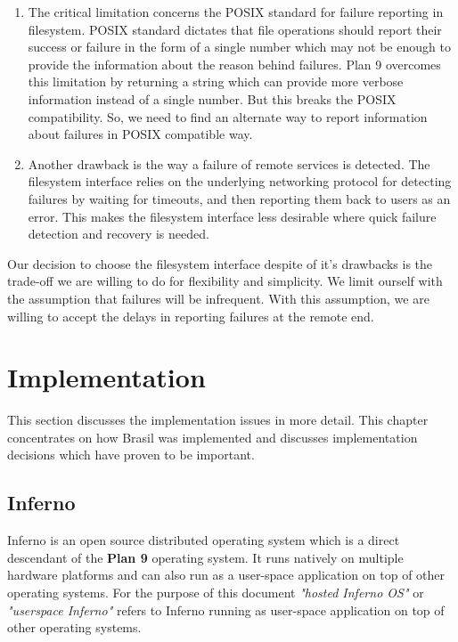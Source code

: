 \documentclass[conference]{sig-alternate}
\begin{document}
\begin{enumerate}

\item The critical limitation concerns the POSIX standard for failure
reporting in filesystem.  POSIX standard dictates that file operations should
report their success or failure in the form of a single number which may not be
enough to provide the information about the reason behind failures.  Plan 9
overcomes this limitation by returning a string which can provide more
verbose information instead of a single number.  But this breaks the POSIX
compatibility.  So, we need to find an alternate way to report information
about failures in POSIX compatible way.

\item Another drawback is the way a failure of remote services is detected.
The filesystem interface relies on the underlying networking protocol for
detecting failures by waiting for timeouts, and then reporting them back to
users as an error.  This makes the filesystem interface less desirable where
quick failure detection and recovery is needed.


\end{enumerate}

Our decision to choose the filesystem interface despite of it's drawbacks is the
trade-off we are willing to do for flexibility and simplicity.  We limit
ourself with the assumption that failures will be infrequent.  With this
assumption, we are willing to accept the delays in reporting failures at the
remote end.


\section{Implementation}

This section discusses the implementation issues in more detail.  This chapter
concentrates on how Brasil was implemented and discusses implementation
decisions which have proven to be important.


\subsection{Inferno}
Inferno\cite{inferno} is an open source distributed operating system which is a 
direct descendant of the \textbf{Plan 9} operating system.  It runs natively on
multiple hardware platforms and can also run as a user-space application on
top of other operating systems.  For the purpose of this document
\textit{"hosted Inferno OS"} or \textit{"userspace Inferno"} refers to Inferno
running as user-space application on top of other operating systems.
\end{document}
